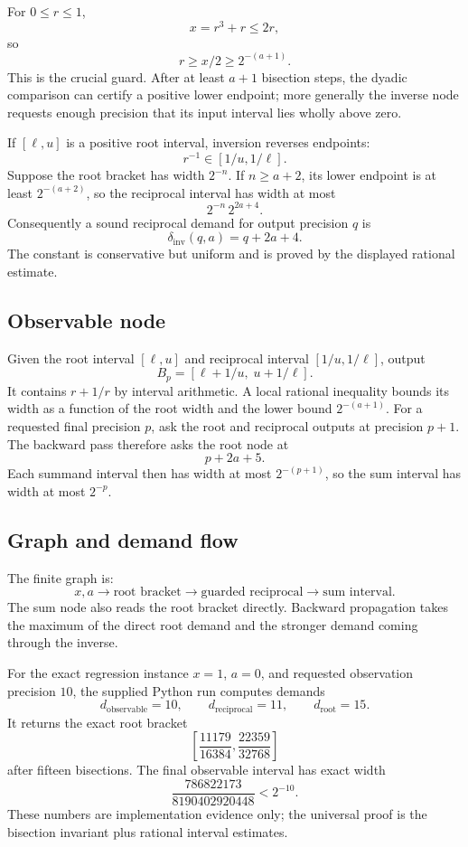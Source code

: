 For \(0\leq r\leq1\),
\[
 x=r^3+r\leq2r,
\]
so
\[
 r\geq x/2\geq2^{-(a+1)}.
\]
This is the crucial guard.  After at least \(a+1\) bisection steps, the dyadic
comparison can certify a positive lower endpoint; more generally the inverse
node requests enough precision that its input interval lies wholly above
zero.

If \([\ell,u]\) is a positive root interval, inversion reverses endpoints:
\[
  r^{-1}\in[1/u,1/\ell].
\]
Suppose the root bracket has width \(2^{-n}\).  If \(n\geq a+2\), its
lower endpoint is at least \(2^{-(a+2)}\), so the reciprocal interval has
width at most
\[
  2^{-n}\,2^{2a+4}.
\]
Consequently a sound reciprocal demand for output precision \(q\) is
\[
 \delta_{\mathrm{inv}}(q,a)=q+2a+4.
\]
The constant is conservative but uniform and is proved by the displayed
rational estimate.

\subsection{Observable node}

Given the root interval \([\ell,u]\) and reciprocal interval
\([1/u,1/\ell]\), output
\[
  B_p=[\ell+1/u,\;u+1/\ell].
\]
It contains \(r+1/r\) by interval arithmetic.  A local rational inequality
bounds its width as a function of the root width and the lower bound
\(2^{-(a+1)}\).  For a requested final precision \(p\), ask the root and reciprocal
outputs at precision \(p+1\).  The backward pass therefore asks the root node at
\[
  p+2a+5.
\]
Each summand interval then has width at most \(2^{-(p+1)}\), so the sum interval
has width at most \(2^{-p}\).

\subsection{Graph and demand flow}

The finite graph is:
\[
 \boxed{x,a}
 \longrightarrow
 \boxed{\text{root bracket}}
 \longrightarrow
 \boxed{\text{guarded reciprocal}}
 \longrightarrow
 \boxed{\text{sum interval}}.
\]
The sum node also reads the root bracket directly.  Backward propagation takes
the maximum of the direct root demand and the stronger demand coming through
the inverse.

For the exact regression instance \(x=1\), \(a=0\), and requested observation
precision \(10\), the supplied Python run computes demands
\[
 d_{\mathrm{observable}}=10,\qquad
 d_{\mathrm{reciprocal}}=11,\qquad
 d_{\mathrm{root}}=15.
\]
It returns the exact root bracket
\[
 \left[\frac{11179}{16384},\frac{22359}{32768}\right]
\]
after fifteen bisections.  The final observable interval has exact width
\[
 \frac{786822173}{8190402920448}<2^{-10}.
\]
These numbers are implementation evidence only; the universal proof is the
bisection invariant plus rational interval estimates.

